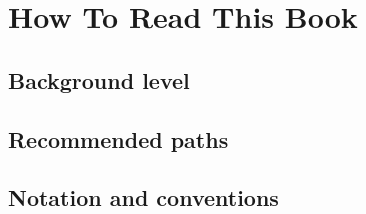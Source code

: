 \chapter{How To Read This Book}

\section{Background level}

\section{Recommended paths}


\section{Notation and conventions}













